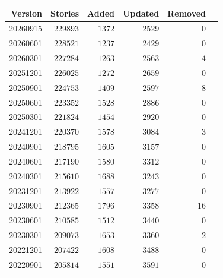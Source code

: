 \documentclass[hidelinks,a4paper,12pt]{article}
\begin{document}
\begin{longtable}{|r|r|r|r|r|r|} \hline
\textbf{Version} & \textbf{Stories} & \textbf{Added} & \textbf{Updated} & \textbf{Removed} \\ \hline
20260915         & $229893$         & $1372$         & $2529$           & $0$              \\ \hline
20260601         & $228521$         & $1237$         & $2429$           & $0$              \\ \hline
20260301         & $227284$         & $1263$         & $2563$           & $4$              \\ \hline
20251201         & $226025$         & $1272$         & $2659$           & $0$              \\ \hline
20250901         & $224753$         & $1409$         & $2597$           & $8$              \\ \hline
20250601         & $223352$         & $1528$         & $2886$           & $0$              \\ \hline
20250301         & $221824$         & $1454$         & $2920$           & $0$              \\ \hline
20241201         & $220370$         & $1578$         & $3084$           & $3$              \\ \hline
20240901         & $218795$         & $1605$         & $3157$           & $0$              \\ \hline
20240601         & $217190$         & $1580$         & $3312$           & $0$              \\ \hline
20240301         & $215610$         & $1688$         & $3243$           & $0$              \\ \hline
20231201         & $213922$         & $1557$         & $3277$           & $0$              \\ \hline
20230901         & $212365$         & $1796$         & $3358$           & $16$             \\ \hline
20230601         & $210585$         & $1512$         & $3440$           & $0$              \\ \hline
20230301         & $209073$         & $1653$         & $3360$           & $2$              \\ \hline
20221201         & $207422$         & $1608$         & $3488$           & $0$              \\ \hline
20220901         & $205814$         & $1551$         & $3591$           & $0$              \\ \hline

\end{longtable}
\end{document}
